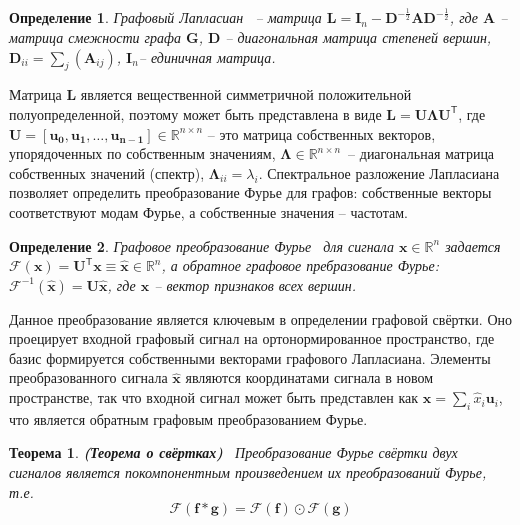 \documentclass[14pt]{extarticle}
\newtheorem{Th}{Теорема}
\newtheorem{Def}{Определение}
\begin{document}
\begin{Def}
	\textit{Графовый Лапласиан}~\cite{Chung:1997} -- матрица $\mathbf{L}=\mathbf{I}_{n}-\mathbf{D}^{-\frac{1}{2}} \mathbf{A} \mathbf{D}^{-\frac{1}{2}}$, где $\mathbf{A}$ -- матрица смежности графа $\mathbf{G}$,  $\mathbf{D}$ -- диагональная матрица степеней вершин, $\mathbf{D}_{i i}=\sum_{j}\left(\mathbf{A}_{i j}\right)$, $\mathbf{I}_{n}$-- единичная матрица.
\end{Def}

Матрица $\mathbf{L}$ является вещественной симметричной положительной полуопределенной, поэтому может быть представлена в виде  $\mathbf{L}=\mathbf{U} \mathbf{\Lambda} \mathbf{U}^{\mathsf{T}} $, где $\mathbf{U}=\left[\mathbf{u}_{\mathbf{0}}, \mathbf{u}_{\mathbf{1}}, \dots, \mathbf{u}_{\mathbf{n}-\mathbf{1}}\right] \in \mathbb{R}^{n \times n}$ -- это матрица собственных векторов, упорядоченных по собственным значениям, $\boldsymbol{\Lambda} \in \mathbb{R}^{n \times n}$~-- диагональная матрица собственных значений (спектр), $\boldsymbol{\Lambda}_{i i}=\lambda_{i}$. Спектральное разложение Лапласиана позволяет определить преобразование Фурье для графов: собственные векторы соответствуют модам Фурье, а собственные значения -- частотам. 

\begin{Def}
	\textit{Графовое преобразование Фурье}~\cite{journals/spm/ShumanNFOV13} для сигнала $\mathbf{x} \in \mathbb{R}^{n}$ задается $\mathscr{F}(\mathbf{x})=\mathbf{U}^{\mathsf{T}} \mathbf{x} \equiv \hat{\mathbf{x}} \in \mathbb{R}^{n}$, а обратное графовое пребразование Фурье: $\mathscr{F}^{-1}(\hat{\mathbf{x}})=\mathbf{U} \hat{\mathbf{x}}$, где $\mathbf{x}$ -- вектор признаков всех вершин.
\end{Def}

Данное преобразование является ключевым в определении графовой свёртки. Оно проецирует входной графовый сигнал на ортонормированное пространство, где базис формируется собственными векторами графового Лапласиана. Элементы преобразованного сигнала $ \hat{\mathbf{x}}$ являются координатами сигнала в новом пространстве, так что входной сигнал может быть представлен как $\mathbf{x}=\sum_{i} \hat{x}_{i} \mathbf{u}_{i}$, что является обратным графовым преобразованием Фурье.

\begin{Th}
	\textbf{(Теорема о свёртках)}~\cite{10.5555/1525499} Преобразование Фурье свёртки двух сигналов является покомпонентным произведением их преобразований Фурье, т.е. $$\mathscr{F}\left( \mathbf{f} * \mathbf{g}\right) =\mathscr{F}(\mathbf{f}) \odot \mathscr{F}(\mathbf{g})$$
	\label{conv_theorem}
\end{Th}
\end{document}
